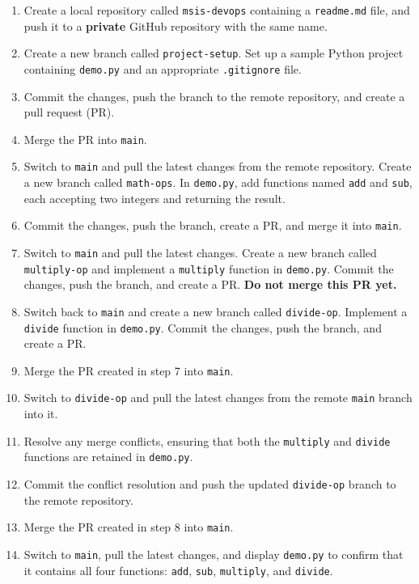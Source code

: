 \documentclass[11pt,a4paper]{article}
\newcommand{\cmd}[1]{\texttt{#1}}
\begin{document}
\begin{enumerate}[label=\textbf{\arabic*.},leftmargin=*,itemsep=3pt]
  \item Create a local repository called \cmd{msis-devops} containing a
        \cmd{readme.md} file, and push it to a \textbf{private} GitHub repository
        with the same name.

  \item Create a new branch called \cmd{project-setup}. Set up a sample Python
        project containing \cmd{demo.py} and an appropriate \cmd{.gitignore} file.

  \item Commit the changes, push the branch to the remote repository, and create
        a pull request (PR).

  \item Merge the PR into \cmd{main}.

  \item Switch to \cmd{main} and pull the latest changes from the remote
        repository. Create a new branch called \cmd{math-ops}. In \cmd{demo.py},
        add functions named \cmd{add} and \cmd{sub}, each accepting two integers
        and returning the result.

  \item Commit the changes, push the branch, create a PR, and merge it into
        \cmd{main}.

  \item Switch to \cmd{main} and pull the latest changes. Create a new branch
        called \cmd{multiply-op} and implement a \cmd{multiply} function in
        \cmd{demo.py}. Commit the changes, push the branch, and create a PR.
        \textbf{Do not merge this PR yet.}

  \item Switch back to \cmd{main} and create a new branch called
        \cmd{divide-op}. Implement a \cmd{divide} function in \cmd{demo.py}.
        Commit the changes, push the branch, and create a PR.

  \item Merge the PR created in step 7 into \cmd{main}.

  \item Switch to \cmd{divide-op} and pull the latest changes from the remote
        \cmd{main} branch into it.

  \item Resolve any merge conflicts, ensuring that both the \cmd{multiply} and
        \cmd{divide} functions are retained in \cmd{demo.py}.

  \item Commit the conflict resolution and push the updated \cmd{divide-op}
        branch to the remote repository.

  \item Merge the PR created in step 8 into \cmd{main}.

  \item Switch to \cmd{main}, pull the latest changes, and display \cmd{demo.py}
        to confirm that it contains all four functions: \cmd{add}, \cmd{sub},
        \cmd{multiply}, and \cmd{divide}.
\end{enumerate}
\end{document}
